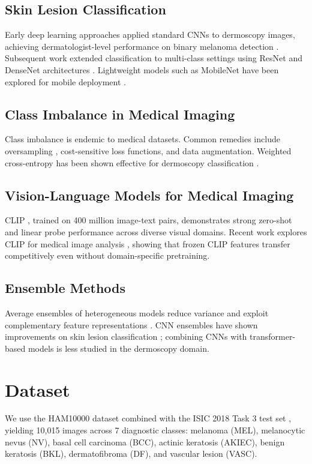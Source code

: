 \documentclass[conference]{IEEEtran}
\begin{document}
\subsection{Skin Lesion Classification}
Early deep learning approaches applied standard CNNs to dermoscopy
images, achieving dermatologist-level performance on binary melanoma
detection \cite{esteva2017}. Subsequent work extended classification
to multi-class settings using ResNet and DenseNet architectures
\cite{adegun2021}. Lightweight models such as MobileNet have
been explored for mobile deployment \cite{howard2017mobilenets}.

\subsection{Class Imbalance in Medical Imaging}
Class imbalance is endemic to medical datasets. Common remedies
include oversampling \cite{chawla2002}, cost-sensitive loss functions,
and data augmentation. Weighted cross-entropy has been shown effective
for dermoscopy classification \cite{buda2018}.

\subsection{Vision-Language Models for Medical Imaging}
CLIP \cite{radford2021}, trained on 400 million image-text pairs,
demonstrates strong zero-shot and linear probe performance across
diverse visual domains. Recent work explores CLIP for medical image
analysis \cite{wang2022medclip}, showing that frozen CLIP features
transfer competitively even without domain-specific pretraining.

\subsection{Ensemble Methods}
Average ensembles of heterogeneous models reduce variance and exploit
complementary feature representations \cite{sagi2018}.
CNN ensembles have shown improvements on skin lesion
classification \cite{harangi2018}; combining CNNs with
transformer-based models is less studied in the dermoscopy domain.

\section{Dataset}

We use the HAM10000 dataset \cite{tschandl2018} combined with the
ISIC 2018 Task 3 test set \cite{codella2019}, yielding 10,015 images
across 7 diagnostic classes: melanoma (MEL), melanocytic nevus (NV),
basal cell carcinoma (BCC), actinic keratosis (AKIEC), benign
keratosis (BKL), dermatofibroma (DF), and vascular lesion (VASC).
\end{document}
